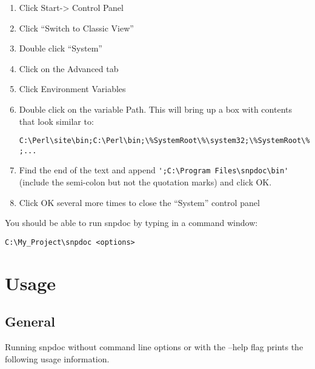 \documentclass[11pt]{article}
\begin{document}
\begin{enumerate}
\item Click Start-> Control Panel
\item Click ``Switch to Classic View''
\item Double click ``System''
\item Click on the Advanced tab
\item Click Environment Variables
\item Double click on the variable Path.  This will bring up a box with contents
      that look similar to:

      \verb+C:\Perl\site\bin;C:\Perl\bin;\%SystemRoot\%\system32;\%SystemRoot\%;...+
\item Find the end of the text and append \verb+';C:\Program Files\snpdoc\bin'+
      (include the semi-colon but not the quotation marks) and click OK.
\item Click OK several more times to close the ``System'' control panel
\end{enumerate}

   You should be able to run snpdoc by typing in a command window:

   \verb+C:\My_Project\snpdoc <options>+
\section{Usage}
\label{sec-4}
\subsection{General}
\label{sec-4-1}


   Running snpdoc without command line options or with the --help flag
   prints the following usage information.
\end{document}
